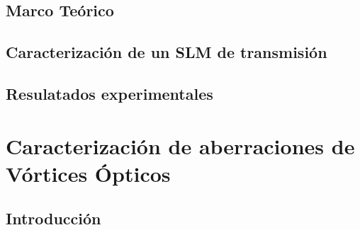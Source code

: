 \documentclass[xcolor=table,serif]{beamer}
\begin{document}
\subsection{Marco Teórico}
\subsection{Caracterización de un SLM de transmisión}
\subsection{Resulatados experimentales}

\section{Caracterización de aberraciones de Vórtices Ópticos}
\subsection{Introducción}
\end{document}
